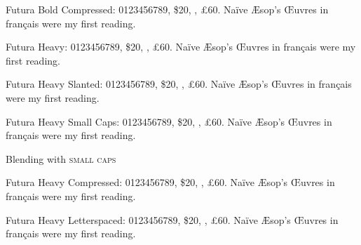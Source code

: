 \documentclass{minimal}
\begin{document}
{\selectfont
Futura  Bold Compressed:  0123456789, \$20, , \pounds60.
Na\"ive \AE sop's \OE uvres in fran\c cais were my first reading.
\lipsum[74]}

{\selectfont
Futura  Heavy:  0123456789, \$20, , \pounds60.
Na\"ive \AE sop's \OE uvres in fran\c cais were my first reading.
\lipsum[81]

{\selectfont
Futura  Heavy Slanted:  0123456789, \$20, , \pounds60.
Na\"ive \AE sop's \OE uvres in fran\c cais were my first reading.
\lipsum[82]}

{\selectfont
Futura  Heavy Small Caps:  0123456789, \$20, , \pounds60.
Na\"ive \AE sop's \OE uvres in fran\c cais were my first reading.
\lipsum[83]}

Blending with \textsc{small caps}}

{\selectfont
Futura  Heavy Compressed:  0123456789, \$20, , \pounds60.
Na\"ive \AE sop's \OE uvres in fran\c cais were my first reading.
\lipsum[91]}

{\selectfont
Futura Heavy Letterspaced:  0123456789, \$20, , \pounds60.
Na\"ive \AE sop's \OE uvres in fran\c cais were my first reading.
\lipsum[84]}
\end{document}
